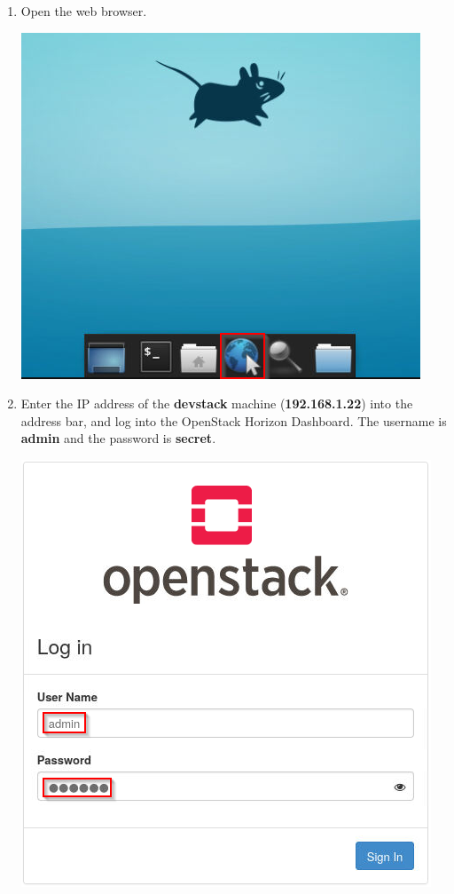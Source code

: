 \documentclass[letterpaper, 12pt]{article}
\begin{document}
\begin{enumerate}
    \item Open the web browser.

    \begin{center}
    \includegraphics[scale=0.75]{images/part1/step1.png}
    \end{center}

    \item Enter the IP address of the \textbf{devstack} machine (\textbf{192.168.1.22}) into the address bar, and log
    into the OpenStack Horizon Dashboard. The username is \textbf{admin} and the password is \textbf{secret}.
    
    \begin{center}
        \includegraphics[scale=0.75]{images/part1/step2.png}
    \end{center}


\end{enumerate}
\end{document}
